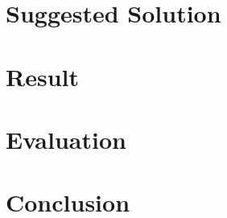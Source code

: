 \documentclass[11pt]{article}
\begin{document}
	\section*{Suggested Solution}


	\section*{Result}


	\section*{Evaluation}


	\section*{Conclusion}

\end{document}
